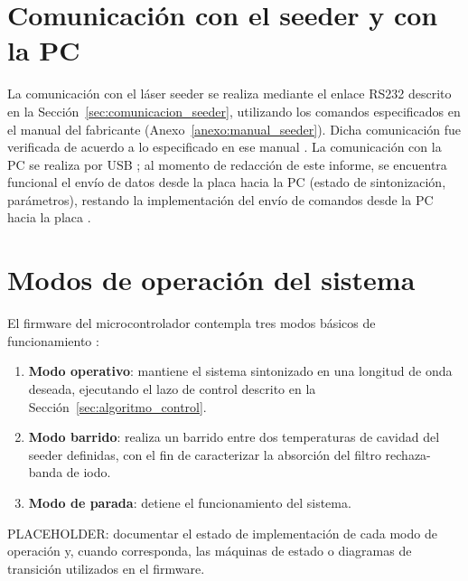 
\section{Comunicaci\'on con el seeder y con la PC}
\label{sec:comunicacion_seeder_pc}

La comunicaci\'on con el l\'aser seeder se realiza mediante el enlace
RS232 descrito en la Secci\'on~\ref{sec:comunicacion_seeder}, utilizando
los comandos especificados en el manual del fabricante (Anexo~\ref{anexo:manual_seeder}).
Dicha comunicaci\'on fue verificada de acuerdo a lo especificado en ese
manual \cite{informeAbril2026}. La comunicaci\'on con la PC se realiza
por USB \cite{sat2026}; al momento de redacci\'on de este informe, se
encuentra funcional el env\'io de datos desde la placa hacia la PC
(estado de sintonizaci\'on, par\'ametros), restando la implementaci\'on
del env\'io de comandos desde la PC hacia la placa \cite{informeAbril2026}.

\section{Modos de operaci\'on del sistema}
\label{sec:modos_operacion}

El firmware del microcontrolador contempla tres modos b\'asicos de
funcionamiento \cite{sat2026}:

\begin{enumerate}
  \item \textbf{Modo operativo}: mantiene el sistema sintonizado en una
        longitud de onda deseada, ejecutando el lazo de control descrito
        en la Secci\'on~\ref{sec:algoritmo_control}.
  \item \textbf{Modo barrido}: realiza un barrido entre dos temperaturas
        de cavidad del seeder definidas, con el fin de caracterizar la
        absorci\'on del filtro rechaza-banda de iodo.
  \item \textbf{Modo de parada}: detiene el funcionamiento del sistema.
\end{enumerate}

PLACEHOLDER: documentar el estado de implementaci\'on de cada modo de
operaci\'on y, cuando corresponda, las m\'aquinas de estado o diagramas
de transici\'on utilizados en el firmware.
